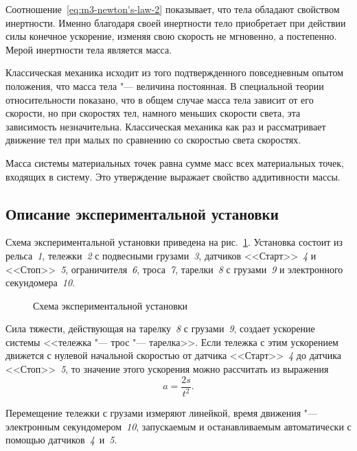\documentclass[a4paper, 12pt]{extarticle}
\begin{document}
Соотношение~\eqref{eq:m3-newton's-law-2} показывает, что тела обладают свойством инертности. Именно благодаря своей инертности тело приобретает при действии силы конечное ускорение, изменяя свою скорость не мгновенно, а постепенно. Мерой инертности тела является масса.

Классическая механика исходит из того подтвержденного повседневным опытом положения, что масса тела "--- величина постоянная. В специальной теории относительности показано, что в общем случае масса тела зависит от его скорости, но при скоростях тел, намного меньших скорости света, эта зависимость незначительна. Классическая механика как раз и рассматривает движение тел при малых по сравнению со скоростью света скоростях.

Масса системы материальных точек равна сумме масс всех материальных точек, входящих в систему. Это утверждение выражает свойство аддитивности массы.

\subsection{Описание экспериментальной установки}
Схема экспериментальной установки приведена на рис.~\ref{fig:m3-equipment}. Установка состоит из рельса~\emph{1}, тележки~\emph{2} с подвесными грузами~\emph{3}, датчиков <<Старт>>~\emph{4} и <<Стоп>>~\emph{5}, ограничителя~\emph{6}, троса~\emph{7}, тарелки~\emph{8} с грузами~\emph{9} и электронного секундомера~\emph{10}.

\begin{figure}[h]
\begin{center}
\end{center}
\caption{Схема экспериментальной установки \label{fig:m3-equipment}}
\end{figure}

Сила тяжести, действующая на тарелку~\emph{8} с грузами~\emph{9}, создает ускорение системы <<тележка "--- трос "--- тарелка>>. Если тележка с этим ускорением движется с нулевой начальной скоростью от датчика <<Старт>>~\emph{4} до датчика <<Стоп>>~\emph{5}, то значение этого ускорения можно рассчитать из выражения %
\begin{equation}
\label{eq:m3-acceleration}
a = \frac{2s}{t^2}.
\end{equation}

Перемещение тележки с грузами измеряют линейкой, время движения "--- электронным секундомером~\emph{10}, запускаемым и останавливаемым автоматически с помощью датчиков~\emph{4}~и~\emph{5}. %
\end{document}
